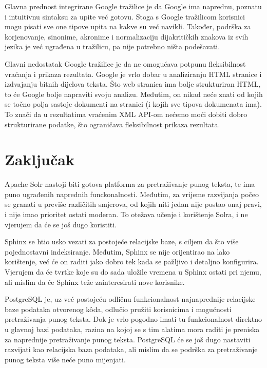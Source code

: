 \documentclass[a4paper,twoside,12pt]{scrreprt}
\begin{document}
Glavna prednost integrirane Google tražilice je da Google ima naprednu, poznatu i intuitivnu sintaksu za upite već gotovu. Stoga s Google tražilicom korisnici mogu pisati sve one tipove upita na kakve su već navikli. Također, podrška za korjenovanje, sinonime, akronime i normalizaciju dijakritičkih znakova iz svih jezika je već ugrađena u tražilicu, pa nije potrebno ništa podešavati.

Glavni nedostatak Google tražilice je da ne omogućava potpunu fleksibilnost vraćanja i prikaza rezultata. Google je vrlo dobar u analiziranju HTML stranice i izdvajanju bitnih dijelova teksta. Što web stranica ima bolje strukturiran HTML, to će Google bolje napraviti svoju analizu. Međutim, on nikad neće znati od kojih se točno polja sastoje dokumenti na stranici (i kojih sve tipova dokumenata ima). To znači da u rezultatima vraćenim XML API-om nećemo moći dobiti dobro strukturirane podatke, što ograničava fleksibilnost prikaza rezultata.

\chapter{Zaključak}

Apache Solr nastoji biti gotova platforma za pretraživanje punog teksta, te ima puno ugrađenih naprednih funckonalnosti. Međutim, za vrijeme razvijanja počeo se granati u previše različitih smjerova, od kojih niti jedan nije postao onaj pravi, i nije imao prioritet ostati moderan. To otežava učenje i korištenje Solra, i ne vjerujem da će se još dugo koristiti.

Sphinx se htio usko vezati za postojeće relacijske baze, s ciljem da što više pojednostavni indeksiranje. Međutim, Sphinx se nije orijentirao na lako korištenje, već će on raditi jako dobro tek kada se pažljivo i detaljno konfigurira. Vjerujem da će tvrtke koje su do sada uložile vremena u Sphinx ostati pri njemu, ali mislim da će Sphinx teže zainteresirati nove korisnike.

PostgreSQL je, uz već postojeću odličnu funkcionalnost najnaprednije relacijske baze podataka otvorenog kôda, odlučio pružiti korisnicima i mogućnosti pretraživanja punog teksta. Dok je vrlo pogodno imati tu funkcionalnost direktno u glavnoj bazi podataka, razina na kojoj se s tim alatima mora raditi je preniska za naprednije pretraživanje punog teksta. PostgreSQL će se još dugo nastaviti razvijati kao relacijska baza podataka, ali mislim da se podrška za pretraživanje punog teksta više neće puno mijenjati.
\end{document}
